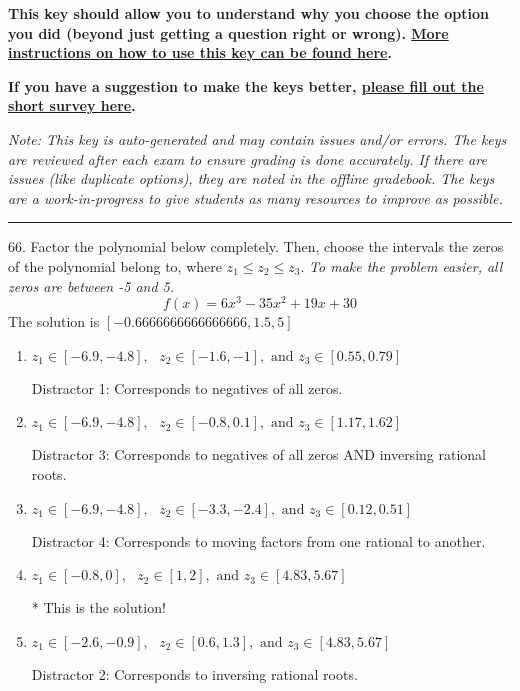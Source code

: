 \documentclass{extbook}[14pt]
\begin{document}
\textbf{This key should allow you to understand why you choose the option you did (beyond just getting a question right or wrong). \href{https://xronos.clas.ufl.edu/mac1105spring2020/courseDescriptionAndMisc/Exams/LearningFromResults}{More instructions on how to use this key can be found here}.}

\textbf{If you have a suggestion to make the keys better, \href{https://forms.gle/CZkbZmPbC9XALEE88}{please fill out the short survey here}.}

\textit{Note: This key is auto-generated and may contain issues and/or errors. The keys are reviewed after each exam to ensure grading is done accurately. If there are issues (like duplicate options), they are noted in the offline gradebook. The keys are a work-in-progress to give students as many resources to improve as possible.}

\rule{\textwidth}{0.4pt}

66. Factor the polynomial below completely. Then, choose the intervals the zeros of the polynomial belong to, where $z_1 \leq z_2 \leq z_3$. \textit{To make the problem easier, all zeros are between -5 and 5.}
\[ f(x) = 6x^{3} -35 x^{2} +19 x + 30 \] 
The solution is $ [-0.6666666666666666, 1.5, 5] $ 

\begin{enumerate}[label=\Alph*.] 
\item $ z_1 \in [-6.9, -4.8], \text{   }  z_2 \in [-1.6, -1], \text{   and   } z_3 \in [0.55, 0.79] $ 

  Distractor 1: Corresponds to negatives of all zeros. 
\item $ z_1 \in [-6.9, -4.8], \text{   }  z_2 \in [-0.8, 0.1], \text{   and   } z_3 \in [1.17, 1.62] $ 

  Distractor 3: Corresponds to negatives of all zeros AND inversing rational roots. 
\item $ z_1 \in [-6.9, -4.8], \text{   }  z_2 \in [-3.3, -2.4], \text{   and   } z_3 \in [0.12, 0.51] $ 

  Distractor 4: Corresponds to moving factors from one rational to another. 
\item $ z_1 \in [-0.8, 0], \text{   }  z_2 \in [1, 2], \text{   and   } z_3 \in [4.83, 5.67] $ 

 * This is the solution! 
\item $ z_1 \in [-2.6, -0.9], \text{   }  z_2 \in [0.6, 1.3], \text{   and   } z_3 \in [4.83, 5.67] $ 

  Distractor 2: Corresponds to inversing rational roots. 
\end{enumerate} 
 
\end{document}
